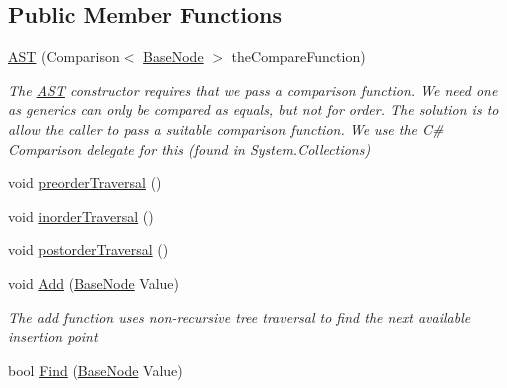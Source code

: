 \subsection*{Public Member Functions}
\begin{DoxyCompactItemize}
\item 
\hyperlink{class_c_p_u___o_s___simulator_1_1_compiler_1_1_frontend_1_1_syntax_tree_1_1_a_s_t_aadbd3af47353b1564454f2352b188875}{A\+S\+T} (Comparison$<$ \hyperlink{class_c_p_u___o_s___simulator_1_1_compiler_1_1_frontend_1_1_syntax_tree_1_1_base_node}{Base\+Node} $>$ the\+Compare\+Function)
\begin{DoxyCompactList}\small\item\em The \hyperlink{class_c_p_u___o_s___simulator_1_1_compiler_1_1_frontend_1_1_syntax_tree_1_1_a_s_t}{A\+S\+T} constructor requires that we pass a comparison function. We need one as generics can only be compared as equals, but not for order. The solution is to allow the caller to pass a suitable comparison function. We use the C\# Comparison delegate for this (found in System.\+Collections) \end{DoxyCompactList}\item 
void \hyperlink{class_c_p_u___o_s___simulator_1_1_compiler_1_1_frontend_1_1_syntax_tree_1_1_a_s_t_a73bb6e82554120e16b12f975ccfc44a5}{preorder\+Traversal} ()
\item 
void \hyperlink{class_c_p_u___o_s___simulator_1_1_compiler_1_1_frontend_1_1_syntax_tree_1_1_a_s_t_afc826af945c5461d38b0ca398ab3f14b}{inorder\+Traversal} ()
\item 
void \hyperlink{class_c_p_u___o_s___simulator_1_1_compiler_1_1_frontend_1_1_syntax_tree_1_1_a_s_t_a72dc35aaccad4aeee3373b8d2dbb23d1}{postorder\+Traversal} ()
\item 
void \hyperlink{class_c_p_u___o_s___simulator_1_1_compiler_1_1_frontend_1_1_syntax_tree_1_1_a_s_t_adc6fcfed38dfdeddcbe419523cdc0314}{Add} (\hyperlink{class_c_p_u___o_s___simulator_1_1_compiler_1_1_frontend_1_1_syntax_tree_1_1_base_node}{Base\+Node} Value)
\begin{DoxyCompactList}\small\item\em The add function uses non-\/recursive tree traversal to find the next available insertion point \end{DoxyCompactList}\item 
bool \hyperlink{class_c_p_u___o_s___simulator_1_1_compiler_1_1_frontend_1_1_syntax_tree_1_1_a_s_t_aa37a7925b23003f227b9311c6201a427}{Find} (\hyperlink{class_c_p_u___o_s___simulator_1_1_compiler_1_1_frontend_1_1_syntax_tree_1_1_base_node}{Base\+Node} Value)

\end{DoxyCompactItemize}
